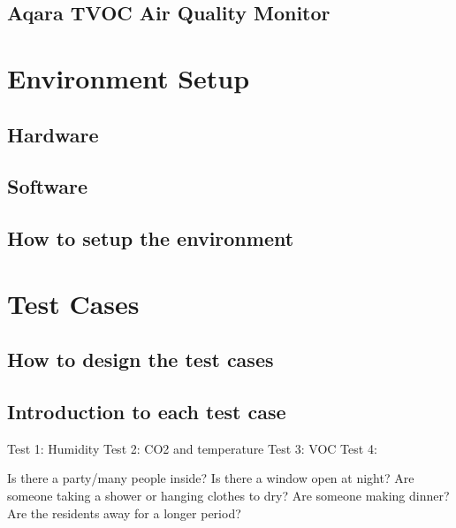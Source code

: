 \subsection{Aqara TVOC Air Quality Monitor}

\section{Environment Setup}
\subsection{Hardware}
\subsection{Software}
\subsection{How to setup the environment}

\section{Test Cases}
\subsection{How to design the test cases}
\subsection{Introduction to each test case}

Test 1: Humidity
Test 2: CO2 and temperature
Test 3: VOC
Test 4: 

Is there a party/many people inside?
Is there a window open at night?
Are someone taking a shower or hanging clothes to dry?
Are someone making dinner?
Are the residents away for a longer period?
